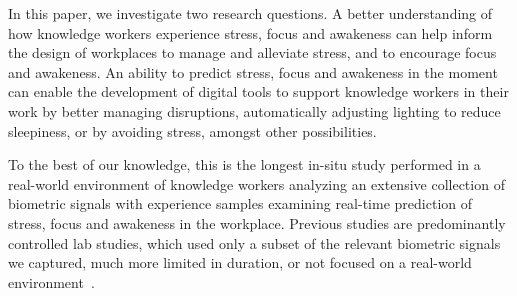 In this paper, we investigate two research questions.  A better understanding of how knowledge workers experience stress, focus
and awakeness can help inform the design of workplaces to manage and alleviate stress,
and to encourage  focus and awakeness.  An ability to predict stress, focus
and awakeness in the moment can enable the development of digital tools to support  knowledge
workers in their work by better managing disruptions, automatically adjusting lighting
to reduce sleepiness, or by avoiding stress, amongst other possibilities.


To the best of our knowledge, this is the 
longest in-situ study performed in a real-world 
environment of knowledge workers analyzing an extensive collection of biometric signals with experience samples examining real-time prediction of stress, focus and awakeness in the workplace.
Previous studies are predominantly controlled lab studies, which used only a subset of the relevant biometric signals we captured, much more limited in duration, or not focused on a real-world environment~\cite{sano2013stress,healey2005detecting,wijsman2011towards,zuger2015interruptibility,goyal2017intelligent,Parnin2011,Nakagawa2014,Radevski2015}. 





